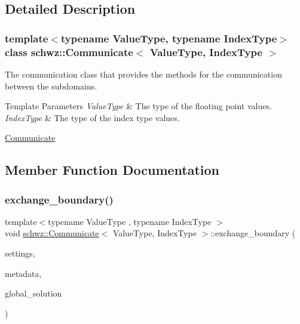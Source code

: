 \subsection{Detailed Description}
\subsubsection*{template$<$typename Value\+Type, typename Index\+Type$>$\newline
class schwz\+::\+Communicate$<$ Value\+Type, Index\+Type $>$}

The communication class that provides the methods for the communication between the subdomains. 


\begin{DoxyTemplParams}{Template Parameters}
{\em Value\+Type} & The type of the floating point values. \\
\hline
{\em Index\+Type} & The type of the index type values.\\
\hline
\end{DoxyTemplParams}
\hyperlink{group__comm}{Communicate} 

\subsection{Member Function Documentation}
\mbox{\label{classschwz_1_1Communicate_a9f305bc37b86b1cf9369acdf6fe32f7d}} 
\subsubsection{\texorpdfstring{exchange\+\_\+boundary()}{exchange\_boundary()}}
{\footnotesize\ttfamily template$<$typename Value\+Type , typename Index\+Type $>$ \\
void \hyperlink{classschwz_1_1Communicate}{schwz\+::\+Communicate}$<$ Value\+Type, Index\+Type $>$\+::exchange\+\_\+boundary (\begin{DoxyParamCaption}\item[{const \hyperlink{structschwz_1_1Settings}{Settings} \&}]{settings,  }\item[{const \hyperlink{structschwz_1_1Metadata}{Metadata}$<$ Value\+Type, Index\+Type $>$ \&}]{metadata,  }\item[{std\+::shared\+\_\+ptr$<$ gko\+::matrix\+::\+Dense$<$ Value\+Type $>$$>$ \&}]{global\+\_\+solution }\end{DoxyParamCaption})\hspace{0.3cm}{\ttfamily [pure virtual]}}



